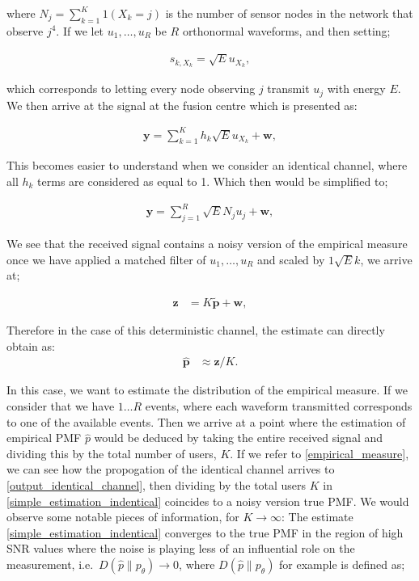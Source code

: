 \documentclass{article}
\begin{document}
where $N_j =\sum_{k=1}^K 1(X_k = j)$ is the number of sensor nodes in the network that observe $j^4$. If we let $u_1,\dots,u_R$ be $R$ orthonormal waveforms, and then setting;

\begin{align}
    s_{k,X_k} = \sqrt{E}u_{X_k}, 
\end{align}

which corresponds to letting every node observing $j$ transmit $u_j$ with energy $E$.  We then arrive at the signal at the fusion centre which is presented as:

\begin{align}
    \boldsymbol{y} = \sum_{k=1}^K h_k  \sqrt{E}u_{X_k} + \boldsymbol{w}, \label{eq:system_model}
\end{align}

This becomes easier to understand when we consider an identical channel, where all $h_k$ terms are considered as equal to 1. Which then would be simplified to;

\begin{align}
    \boldsymbol{y} = \sum_{j=1}^R \sqrt{E}N_j u_{j} + \boldsymbol{w}, \label{eq:simplified_system_model}
\end{align}

We see that the received signal contains a noisy version of the empirical measure once we have applied a matched filter of $u_1,\dots,u_R$ and scaled by $1\sqrt{E}k$, we arrive at;

%
\begin{align}
    \boldsymbol{z} &= K \tilde{\boldsymbol{p}} + \boldsymbol{w}, 
    \label{output_identical_channel}
\end{align}

Therefore in the case of this deterministic channel, the estimate can directly obtain as:
%
\begin{align}
    \boldsymbol{\hat{p}} &\approx \boldsymbol{z} / K.
    \label{simple_estimation_indentical}
\end{align}

In this case, we want to estimate the distribution of the empirical measure. If we consider that we have $1 \dots R$ events, where each waveform transmitted corresponds to one of the available events. Then we arrive at a point where the estimation of empirical \ac{PMF} $\hat{p}$ would be deduced by taking the entire received signal and dividing this by the total number of users, $K$. If we refer to \eqref{empirical_measure}, we can see how the propogation of the identical channel arrives to \eqref{output_identical_channel}, then dividing by the total users $K$ in \eqref{simple_estimation_indentical} coincides to a noisy version true \ac{PMF}. We would observe some notable pieces of information, for $K \rightarrow \infty$: The estimate \eqref{simple_estimation_indentical} converges to the true PMF in the region of high SNR values where the noise is playing less of an influential role on the measurement, i.e.~$D(\hat{p}\| p_{\theta}) \rightarrow 0$, where $D(\hat{p}\| p_{\theta})$ for example is defined as;
\end{document}
